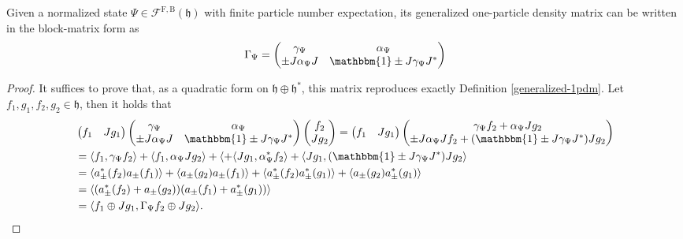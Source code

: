 \begin{lemma}
	Given a normalized state $\Psi\in\mathcal{F}^{\mathrm{F,B}}(\mathfrak{h})$ with finite
	particle number expectation, its generalized one-particle density matrix can be written in the
	block-matrix form as
	\begin{align*}
		\Gamma_\Psi = \begin{pmatrix} \gamma_\Psi & \alpha_\Psi \\ \pm J\alpha_\Psi J & \mathbbm{1}\pm J\gamma_\Psi J^* \end{pmatrix}
	\end{align*}
\end{lemma}
\begin{proof}
	It suffices to prove that, as a quadratic form on $\mathfrak{h}\oplus\mathfrak{h}^*$,
	this matrix reproduces exactly Definition \ref{generalized-1pdm}. Let $f_1,g_1,f_2,g_2
	\in\mathfrak{h}$, then it holds that
	\begin{align*}
		&\begin{pmatrix} f_1 & Jg_1 \end{pmatrix}
		\begin{pmatrix} \gamma_\Psi & \alpha_\Psi \\ \pm J\alpha_\Psi J & \mathbbm{1}\pm J\gamma_\Psi J^* \end{pmatrix}
		\begin{pmatrix} f_2 \\ Jg_2 \end{pmatrix}
		= \begin{pmatrix} f_1 & Jg_1 \end{pmatrix}
		\begin{pmatrix} \gamma_\Psi f_2 + \alpha_\Psi Jg_2 \\ \pm J\alpha_\Psi Jf_2 + (\mathbbm{1}\pm J\gamma_\Psi J^*)Jg_2 \end{pmatrix} \\
		&= \langle f_1,\gamma_\Psi f_2\rangle + \langle f_1,\alpha_\Psi Jg_2 \rangle + \langle
		+ \langle Jg_1,\alpha_\Psi^* f_2\rangle + \langle Jg_1,(\mathbbm{1}\pm J\gamma_\Psi J^*)Jg_2\rangle\\
		&= \langle a^*_\pm(f_2)a_\pm(f_1)\rangle + \langle a_\pm(g_2)a_\pm(f_1)\rangle + \langle a^*_\pm(f_2)a^*_\pm(g_1)\rangle + \langle a_\pm(g_2)a^*_\pm(g_1)\rangle\\
		&= \langle (a^*_\pm(f_2)+a_\pm(g_2))(a_\pm(f_1)+a^*_\pm(g_1)) \rangle\\
		&= \langle f_1\oplus Jg_1, \Gamma_\Psi f_2\oplus Jg_2 \rangle.
	\end{align*}
\end{proof}

